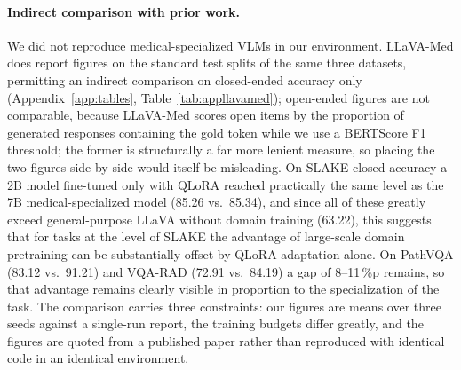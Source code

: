 \paragraph{Indirect comparison with prior work.}
We did not reproduce medical-specialized VLMs in our environment. LLaVA-Med
\citep{li2023llavamed} does report figures on the standard test splits of the same
three datasets, permitting an indirect comparison on closed-ended accuracy only
(Appendix~\ref{app:tables}, Table~\ref{tab:appllavamed}); open-ended figures are
not comparable, because LLaVA-Med scores open items by the proportion of
generated responses containing the gold token while we use a BERTScore F1
threshold; the former is structurally a far more lenient measure, so placing the
two figures side by side would itself be misleading. On SLAKE closed accuracy a 2B
model fine-tuned only with QLoRA reached practically the same level as the 7B
medical-specialized model (85.26 vs.\ 85.34), and since all of these greatly
exceed general-purpose LLaVA without domain training (63.22), this suggests that
for tasks at the level of SLAKE the advantage of large-scale domain pretraining
can be substantially offset by QLoRA adaptation alone. On PathVQA (83.12 vs.\
91.21) and VQA-RAD (72.91 vs.\ 84.19) a gap of 8--11\,\%p remains, so that
advantage remains clearly visible in proportion to the specialization of the task.
The comparison carries three constraints: our figures are means over three seeds
against a single-run report, the training budgets differ greatly, and the figures
are quoted from a published paper rather than reproduced with identical code in
an identical environment.

